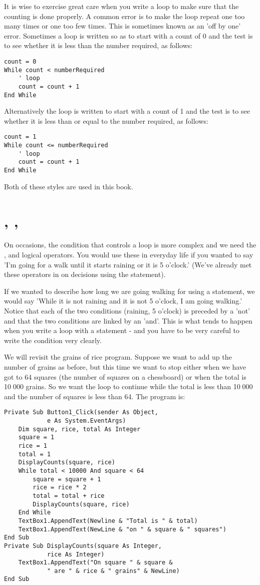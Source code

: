 		It is wise to exercise great care when you write a  loop to make sure that the counting is done properly. A common error is to make the loop repeat one too many times or one too few times. This is sometimes known as an 'off by one' error. Sometimes a loop is written so as to start with a count of 0 and the test is to see whether it is less than the number required, as follows:
		\begin{lstlisting}
count = 0
While count < numberRequired
	' loop
	count = count + 1
End While
		\end{lstlisting}
		Alternatively the loop is written to start with a count of 1 and the test is to see whether it is less than or equal to the number required, as follows:
		\begin{lstlisting}
count = 1
While count <= numberRequired
	' loop
	count = count + 1
End While
		\end{lstlisting}
		Both of these styles are used in this book.


	\section{, , }
	On occasions, the condition that controls a loop is more complex and we need the ,  and  logical operators. You would use these in everyday life if you wanted to say 'I'm going for a walk until it starts raining or it is 5 o'clock.' (We've already met these operators in  on decisions using the  statement).
		
		If we wanted to describe how long we are going walking for using a  statement, we would say 'While it is not raining and it is not 5 o'clock, I am going walking.' Notice that each of the two conditions (raining, 5 o'clock) is preceded by a 'not' and that the two conditions are linked by an 'and'. This is what tends to happen when you write a loop with a  statement - and you have to be very careful to write the condition very clearly.
		
		We will revisit the grains of rice program. Suppose we want to add up the number of grains as before, but this time we want to stop either when we have got to 64 squares (the number of squares on a chessboard) or when the total is 10 000 grains. So we want the loop to continue while the total is less than 10 000 and the number of squares is less than 64. The program is:
		\begin{lstlisting}
Private Sub Button1_Click(sender As Object,
			e As System.EventArgs)
	Dim square, rice, total As Integer
	square = 1
	rice = 1
	total = 1
	DisplayCounts(square, rice)
	While total < 10000 And square < 64
		square = square + 1
		rice = rice * 2
		total = total + rice
		DisplayCounts(square, rice)
	End While
	TextBox1.AppendText(Newline & "Total is " & total)
	TextBox1.AppendText(NewLine & "on " & square & " squares")
End Sub
Private Sub DisplayCounts(square As Integer,
			rice As Integer)
	TextBox1.AppendText("On square " & square &
			" are " & rice & " grains" & NewLine)
End Sub
		\end{lstlisting}



